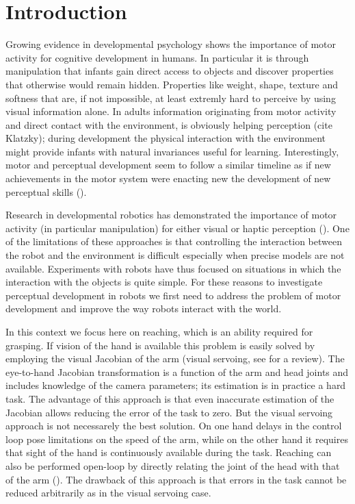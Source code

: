 \section{Introduction}
Growing evidence in developmental psychology shows the importance 
of motor activity for cognitive development in humans. In particular 
it is through manipulation that infants gain direct access to objects 
and discover properties that otherwise would remain hidden. 
Properties like weight, shape, texture and softness that 
are, if not impossible, at least extremly hard to perceive by using
visual information alone. In adults information originating 
from motor activity and direct contact with the environment, is 
obviously helping perception (cite Klatzky); during development
the physical interaction with the environment might
provide infants with natural invariances useful for learning.
Interestingly, motor and perceptual development seem to follow a similar 
timeline as if new achievements in the motor system were enacting new
the development of new perceptual skills (\cite{bushnell93motor}\cite{needham2002pick-me-up}).

Research in developmental robotics has demonstrated the importance of
motor activity (in particular manipulation) for either visual or haptic 
perception (\cite{fitzpatrick07shared}). One of the 
limitations of these approaches is that controlling the interaction between
the robot and the environment is difficult especially when precise models are
not available. Experiments with robots have thus focused on situations
in which the interaction with the objects is quite simple. For these reasons
to investigate perceptual development in robots we first need to 
address the problem of motor development and improve the way robots interact
with the world.

In this context we focus here on reaching, which is an ability required for 
grasping. If vision of the hand is available this problem is easily solved 
by employing the visual Jacobian of the arm (visual servoing, see 
\cite{hutchinson96tutorial} for a review). The 
eye-to-hand Jacobian transformation is a function of the arm and head joints 
and includes knowledge of the camera parameters; its estimation is in practice 
a hard task.
The advantage of this approach is that even inaccurate estimation of the Jacobian
allows reducing the error of the task to zero. But the visual servoing approach 
is not necessarely the best solution. On one hand delays in the control loop pose 
limitations on the speed of the arm, while on the other hand it
requires that sight of the hand is continuously available during the task. 
Reaching can also be performed open-loop by directly relating the joint of 
the head with that of the arm (\cite{blackburn94learning}\cite{metta99developmental}). 
The drawback of this approach is that errors in the task cannot be reduced 
arbitrarily as in the visual servoing case.

